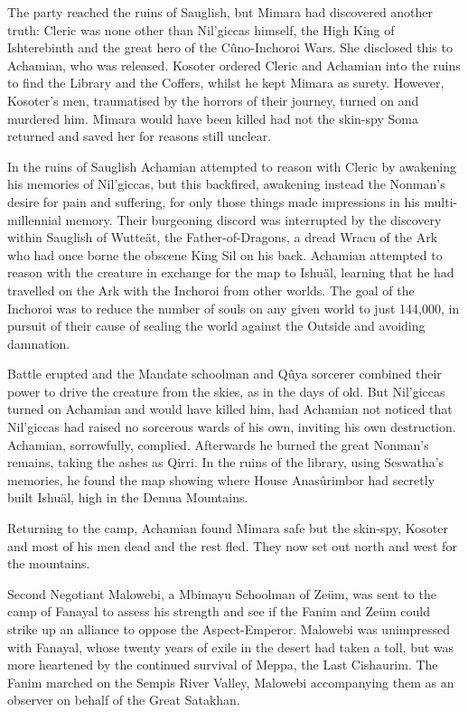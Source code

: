 \documentclass[]{book}
\begin{document}
The party reached the ruins of Sauglish, but Mimara had discovered another truth:
Cleric was none other than Nil'giccas himself, the High King of Ishterebinth and the
great hero of the Cûno-Inchoroi Wars. She disclosed this to Achamian, who was
released. Kosoter ordered Cleric and Achamian into the ruins to find the Library and
the Coffers, whilst he kept Mimara as surety. However, Kosoter's men, traumatised by
the horrors of their journey, turned on and murdered him. Mimara would have been
killed had not the skin-spy Soma returned and saved her for reasons still unclear.

In the ruins of Sauglish Achamian attempted to reason with Cleric by awakening his
memories of Nil'giccas, but this backfired, awakening instead the Nonman's desire for
pain and suffering, for only those things made impressions in his multi-millennial
memory. Their burgeoning discord was interrupted by the discovery within Sauglish of
Wutteät, the Father-of-Dragons, a dread Wracu of the Ark who had once borne the
obscene King Sil on his back. Achamian attempted to reason with the creature in
exchange for the map to Ishuäl, learning that he had travelled on the Ark with the
Inchoroi from other worlds. The goal of the Inchoroi was to reduce the number of
souls on any given world to just 144,000, in pursuit of their cause of sealing the world
against the Outside and avoiding damnation.

Battle erupted and the Mandate schoolman and Qûya sorcerer combined their power
to drive the creature from the skies, as in the days of old. But Nil'giccas turned on
Achamian and would have killed him, had Achamian not noticed that Nil'giccas had
raised no sorcerous wards of his own, inviting his own destruction. Achamian,
sorrowfully, complied. Afterwards he burned the great Nonman's remains, taking the
ashes as Qirri. In the ruins of the library, using Seswatha's memories, he found the map
showing where House Anasûrimbor had secretly built Ishuäl, high in the Demua
Mountains.

Returning to the camp, Achamian found Mimara safe but the skin-spy, Kosoter and
most of his men dead and the rest fled. They now set out north and west for the
mountains.

Second Negotiant Malowebi, a Mbimayu Schoolman of Zeüm, was sent to the camp of
Fanayal to assess his strength and see if the Fanim and Zeüm could strike up an alliance
to oppose the Aspect-Emperor. Malowebi was unimpressed with Fanayal, whose twenty
years of exile in the desert had taken a toll, but was more heartened by the continued
survival of Meppa, the Last Cishaurim. The Fanim marched on the Sempis River
Valley, Malowebi accompanying them as an observer on behalf of the Great Satakhan.
\end{document}
